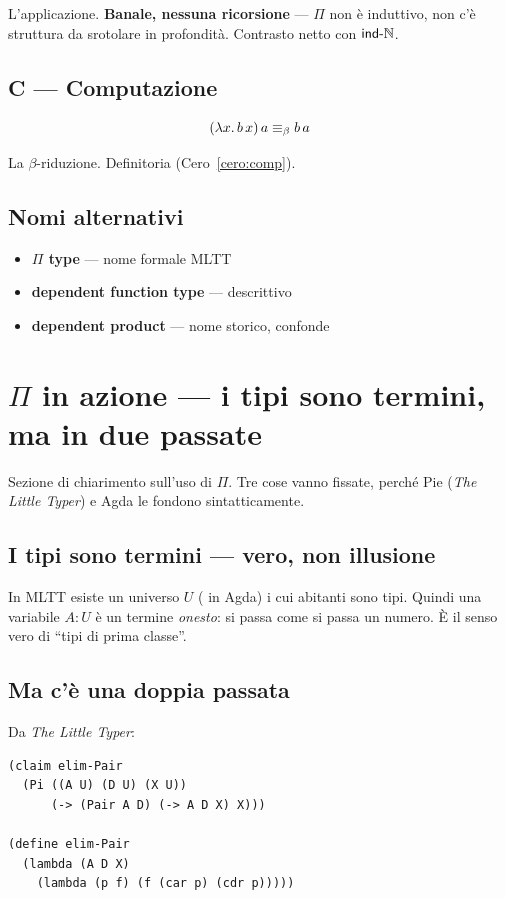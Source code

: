 L'applicazione. \textbf{Banale, nessuna ricorsione} --- $\Pi$ non \`e induttivo, non c'\`e struttura da srotolare in profondit\`a. Contrasto netto con $\mathsf{ind\text{-}\mathbb{N}}$.

\section*{C --- Computazione}
\[
(\lambda x.\,b\,x)\,a \equiv_{\beta} b\,a
\]

La $\beta$-riduzione. Definitoria (Cero~\ref{cero:comp}).

\section*{Nomi alternativi}
\begin{itemize}
\item \textbf{$\Pi$ type} --- nome formale MLTT
\item \textbf{dependent function type} --- descrittivo
\item \textbf{dependent product} --- nome storico, confonde
\end{itemize}

\chapter{$\Pi$ in azione --- i tipi sono termini, ma in due passate}\label{cap:pi-azione}

Sezione di chiarimento sull'uso di $\Pi$. Tre cose vanno fissate, perch\'e Pie (\emph{The Little Typer}) e Agda le fondono sintatticamente.

\section*{I tipi sono termini --- vero, non illusione}

In MLTT esiste un universo $U$ ( in Agda) i cui abitanti sono tipi. Quindi una variabile $A : U$ \`e un termine \emph{onesto}: si passa come si passa un numero. \`E il senso vero di ``tipi di prima classe''.

\section*{Ma c'\`e una doppia passata}

Da \emph{The Little Typer}:
\begin{verbatim}
(claim elim-Pair
  (Pi ((A U) (D U) (X U))
      (-> (Pair A D) (-> A D X) X)))

(define elim-Pair
  (lambda (A D X)
    (lambda (p f) (f (car p) (cdr p)))))
\end{verbatim}

